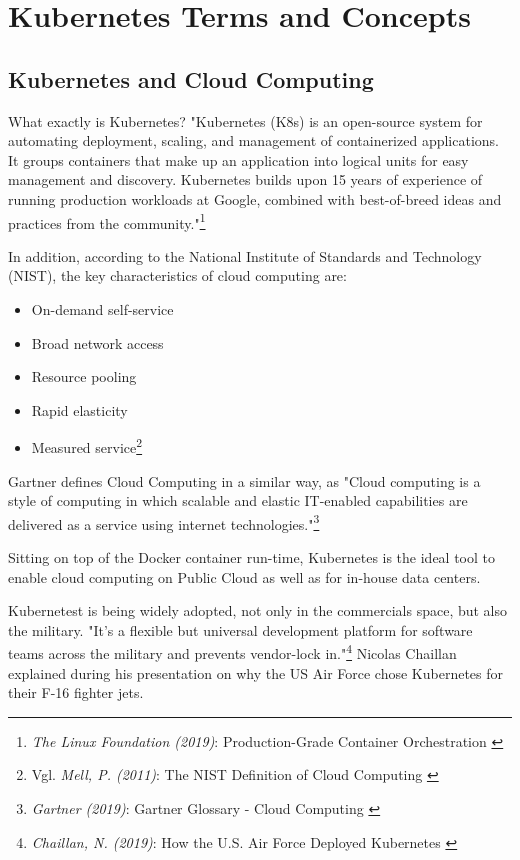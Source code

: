 %
%

\pagebreak
\section{Kubernetes Terms and Concepts}

\onehalfspacing

\subsection{Kubernetes and Cloud Computing}

What exactly is Kubernetes? "Kubernetes (K8s) is an open-source system for automating deployment, scaling, and management of containerized applications.
It groups containers that make up an application into logical units for easy management and discovery. Kubernetes builds upon 15 years of experience of running production workloads at Google, combined with best-of-breed ideas and practices from the community."\footnote{\textit{The Linux Foundation (2019)}: Production-Grade Container Orchestration \cite{kubernetes}}

In addition, according to the National Institute of Standards and Technology (NIST), the key characteristics of cloud computing are: 
\begin{itemize}
\item On-demand self-service
\item Broad network access
\item Resource pooling
\item Rapid elasticity
\item Measured service\footnote{Vgl. \textit{Mell, P. (2011)}: The NIST Definition of Cloud Computing \cite{sp800-145}}
\end{itemize}

Gartner defines Cloud Computing in a similar way, as "Cloud computing is a style of computing in which scalable and elastic IT-enabled capabilities are delivered as a service using internet technologies."\footnote{\textit{Gartner (2019)}: Gartner Glossary - Cloud Computing \cite{gartnerGlossary}}

Sitting on top of the Docker container run-time, Kubernetes is the ideal tool to enable cloud computing on Public Cloud as well as for in-house data centers.

Kubernetest is being widely adopted, not only in the commercials space, but also the military. "It’s a flexible but universal development platform for software teams across the military and prevents vendor-lock in."\footnote{\textit{Chaillan, N. (2019)}: How the U.S. Air Force Deployed Kubernetes \cite{airForce}} Nicolas Chaillan explained during his presentation on why the US Air Force chose Kubernetes for their F-16 fighter jets.

